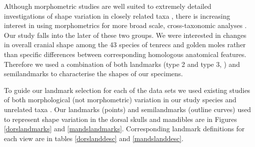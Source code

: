 \documentclass[12pt,a4paper]{article}
\begin{document}
Although morphometric studies are well suited to extremely detailed investigations of shape variation in closely related taxa \citep[e.g.][]{Cardini2003, Panchetti2008, Blagojevic2011}, there is increasing interest in using morphometrics for more broad scale, cross-taxonomic analyses \citep{Wroe2007, Klingenberg2013}. Our study falls into the later of these two groups. We were interested in changes in overall cranial shape among the 43 species of tenrecs and golden moles rather than specific differences between corresponding homologous anatomical features. Therefore we used a combination of both landmarks (type 2 and type 3, \citep{Zelditch2012}) and semilandmarks to characterise the shapes of our specimens. %

To guide our landmark selection for each of the data sets we used existing studies of both morphological (not morphometric) variation in our study species \citep{Asher1999, Asher2008, Asher2010} and unrelated taxa \citep[e.g.][]{Barrow2008, Panchetti2008, Macholan2008, Klenovsek2013}. %
Our landmarks (points) and semilandmarks (outline curves) used to represent shape variation in the dorsal skulls and mandibles are in Figures \ref{dorslandmarks} and \ref{mandslandmarks}. Corresponding landmark definitions for each view are in tables \ref{dorslanddesc} and \ref{mandslanddesc}.


\end{document}
